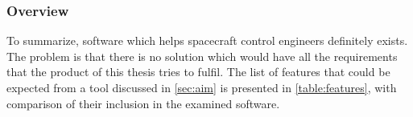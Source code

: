     \subsubsection{Overview}
        To summarize, software which helps spacecraft control engineers definitely exists. The problem is that there is no solution which would have all the requirements that the product of this thesis tries to fulfil. The list of features that could be expected from a tool discussed in \autoref{sec:aim} is presented in \autoref{table:features}, with comparison of their inclusion in the examined software.

